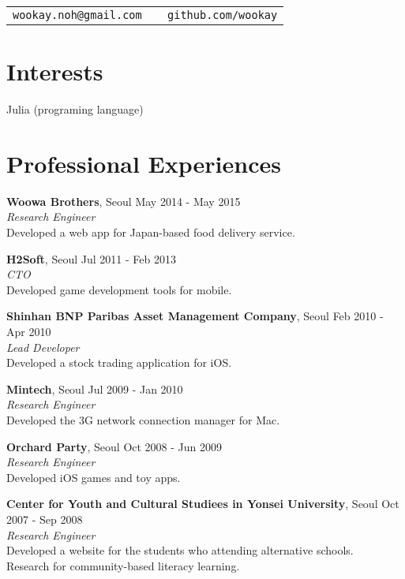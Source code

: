 \documentclass[margin,line]{res}
\begin{document}

\begin{resume}

\vspace{-1.35cm}

\begin{flushright}
\begin{tabular}{@{}l|l}
\texttt{wookay.noh@gmail.com } & \texttt{ github.com/wookay} \\
\end{tabular}
\end{flushright}

\section{\sc Interests}
Julia (programing language)

\section{\sc Professional Experiences}

{\bf Woowa Brothers}, Seoul \hfill May 2014 - May 2015 \\
{\em Research Engineer} \\
Developed a web app for Japan-based food delivery service.

{\bf H2Soft}, Seoul \hfill Jul 2011 - Feb 2013 \\
{\em CTO} \\
Developed game development tools for mobile.

{\bf Shinhan BNP Paribas Asset Management Company}, Seoul \hfill Feb 2010 - Apr 2010 \\
{\em Lead Developer} \\
Developed a stock trading application for iOS.

{\bf Mintech}, Seoul \hfill Jul 2009 - Jan 2010 \\
{\em Research Engineer} \\
Developed the 3G network connection manager for Mac.

{\bf Orchard Party}, Seoul \hfill Oct 2008 - Jun 2009 \\
{\em Research Engineer} \\
Developed iOS games and toy apps.

{\bf Center for Youth and Cultural Studiees in Yonsei University}, Seoul \hfill Oct 2007 - Sep 2008 \\
{\em Research Engineer} \\
Developed a website for the students who attending alternative schools. \\
Research for community-based literacy learning.


\end{resume}
\end{document}

